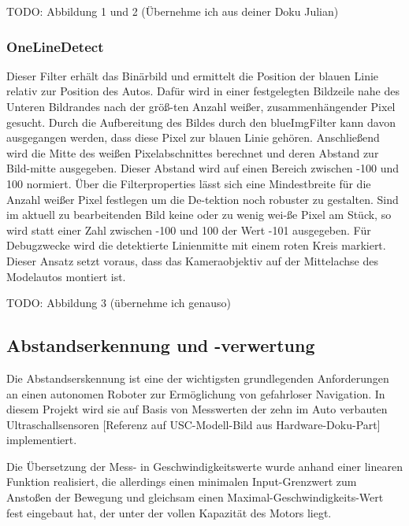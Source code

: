 \documentclass[12pt,a4paper]{report}
\begin{document}
TODO: Abbildung 1 und 2 (Übernehme ich aus deiner Doku Julian)


\subsubsection{OneLineDetect}
Dieser Filter erhält das Binärbild und ermittelt die Position der blauen Linie relativ zur Position des Autos. Dafür wird in einer 
festgelegten Bildzeile nahe des Unteren Bildrandes nach der größ-ten Anzahl weißer, zusammenhängender Pixel gesucht. Durch die Aufbereitung des Bildes durch den blueImgFilter kann davon ausgegangen werden, dass diese Pixel zur blauen Linie gehören. 
Anschließend wird die Mitte des weißen Pixelabschnittes berechnet und deren Abstand zur Bild-mitte ausgegeben. Dieser Abstand 
wird auf einen Bereich zwischen -100 und 100 normiert. Über die Filterproperties lässt sich eine Mindestbreite für die Anzahl 
weißer Pixel festlegen um die De-tektion noch robuster zu gestalten. Sind im aktuell zu bearbeitenden Bild keine oder zu wenig
wei-ße Pixel am Stück, so wird statt einer Zahl zwischen -100 und 100 der Wert -101 ausgegeben.
Für Debugzwecke wird die detektierte Linienmitte mit einem roten Kreis markiert.
Dieser Ansatz setzt voraus, dass das Kameraobjektiv auf der Mittelachse des Modelautos montiert ist.

TODO: Abbildung 3 (übernehme ich genauso)
 

\subsection{Abstandserkennung und -verwertung}
Die Abstandserskennung ist eine der wichtigsten grundlegenden Anforderungen an einen autonomen Roboter zur Ermöglichung von gefahrloser Navigation. In diesem Projekt wird sie auf Basis von Messwerten der zehn im Auto verbauten Ultraschallsensoren [Referenz auf USC-Modell-Bild aus Hardware-Doku-Part] implementiert.

Die Übersetzung der Mess- in Geschwindigkeitswerte wurde anhand einer linearen Funktion realisiert, die allerdings einen minimalen Input-Grenzwert zum Anstoßen der Bewegung und gleichsam einen Maximal-Geschwindigkeits-Wert fest eingebaut hat, der unter der vollen Kapazität des Motors liegt.
\end{document}
